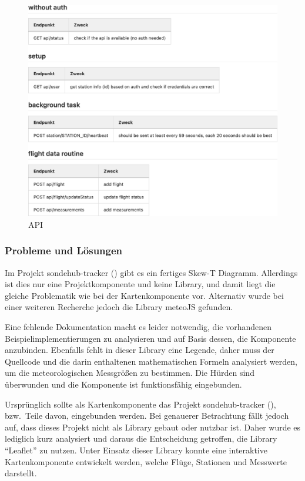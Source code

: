 \begin{figure}[h!]
    \centering
    \caption{API}
    \label{fig:api}
    \includegraphics[scale=0.55]{assets/api}
\end{figure}
\newpage

\subsubsection{Probleme und Lösungen}



Im Projekt sondehub-tracker (\cite{sondehub-tracker}) gibt es ein fertiges Skew-T Diagramm.
Allerdings ist dies nur eine Projektkomponente und keine Library, und damit liegt die gleiche Problematik wie bei der Kartenkomponente vor.
Alternativ wurde bei einer weiteren Recherche jedoch die Library meteoJS gefunden.

Eine fehlende Dokumentation macht es leider notwendig, die vorhandenen Beispielimplementierungen zu analysieren und auf Basis dessen, die Komponente anzubinden.
Ebenfalls fehlt in dieser Library eine Legende, daher muss der Quellcode und die darin enthaltenen mathematischen Formeln analysiert werden, um die meteorologischen Messgrößen zu bestimmen.
Die Hürden sind überwunden und die Komponente ist funktionsfähig eingebunden.

Ursprünglich sollte als Kartenkomponente das Projekt sondehub-tracker (\cite{sondehub-tracker}), bzw.\ Teile davon, eingebunden werden.
Bei genauerer Betrachtung fällt jedoch auf, dass dieses Projekt nicht als Library gebaut oder nutzbar ist.
Daher wurde es lediglich kurz analysiert und daraus die Entscheidung getroffen, die Library \enquote{Leaflet} zu nutzen.
Unter Einsatz dieser Library konnte eine interaktive Kartenkomponente entwickelt werden, welche Flüge, Stationen und Messwerte darstellt.

